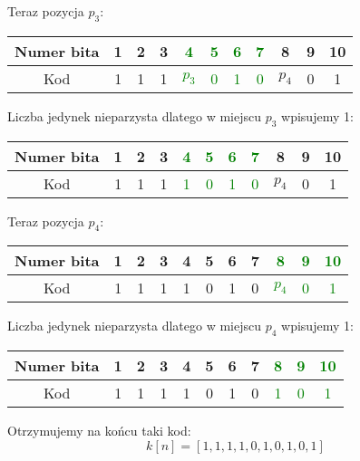\documentclass{article}
\begin{document}
Teraz pozycja $p_3$:
\begin{center}
        \begin{tabular}{|c|c|c|c|c|c|c|c|c|c|c|}
        \hline
        Numer bita & 1 & 2 & 3 & \textcolor{green}{4} & \textcolor{green}{5} & \textcolor{green}{6} & \textcolor{green}{7} & 8 & 9 & 10 \\
        \hline
        Kod & 1 & 1 & 1 & \textcolor{green}{$p_3$} & \textcolor{green}{0} & \textcolor{green}{1} & \textcolor{green}{0} & $p_4$ & 0 & 1 \\
        \hline
    \end{tabular}
\end{center}
Liczba jedynek nieparzysta dlatego w miejscu $p_3$ wpisujemy 1:
\begin{center}
        \begin{tabular}{|c|c|c|c|c|c|c|c|c|c|c|}
        \hline
        Numer bita & 1 & 2 & 3 & \textcolor{green}{4} & \textcolor{green}{5} & \textcolor{green}{6} & \textcolor{green}{7} & 8 & 9 & 10 \\
        \hline
        Kod & 1 & 1 & 1 & \textcolor{green}{1} & \textcolor{green}{0} & \textcolor{green}{1} & \textcolor{green}{0} & $p_4$ & 0 & 1 \\
        \hline
    \end{tabular}
\end{center}
Teraz pozycja $p_4$:
\begin{center}
        \begin{tabular}{|c|c|c|c|c|c|c|c|c|c|c|}
        \hline
        Numer bita & 1 & 2 & 3 & 4 & 5 & 6 & 7 & \textcolor{green}{8} & \textcolor{green}{9} & \textcolor{green}{10} \\
        \hline
        Kod & 1 & 1 & 1 & 1 & 0 & 1 & 0 & \textcolor{green}{$p_4$} & \textcolor{green}{0} & \textcolor{green}{1} \\
        \hline
    \end{tabular}
\end{center}
Liczba jedynek nieparzysta dlatego w miejscu $p_4$ wpisujemy 1:
\begin{center}
        \begin{tabular}{|c|c|c|c|c|c|c|c|c|c|c|}
        \hline
        Numer bita & 1 & 2 & 3 & 4 & 5 & 6 & 7 & \textcolor{green}{8} & \textcolor{green}{9} & \textcolor{green}{10} \\
        \hline
        Kod & 1 & 1 & 1 & 1 & 0 & 1 & 0 & \textcolor{green}{1} & \textcolor{green}{0} & \textcolor{green}{1} \\
        \hline
    \end{tabular}
\end{center}
Otrzymujemy na końcu taki kod:
\[
    k[n]=[1,1,1,1,0,1,0,1,0,1]
\]
\end{document}
